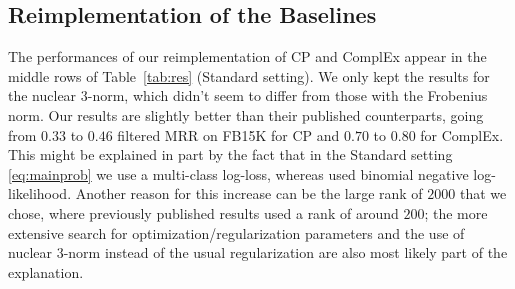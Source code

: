 \documentclass{article}
\newcommand{\CP}{{CP}\xspace}
\newcommand{\complex}{{ComplEx}\xspace}
\newcommand{\fb}{{FB15K}\xspace}
\begin{document}
\subsection{Reimplementation of the Baselines}
The performances of our reimplementation of \CP and \complex appear in the middle rows of Table~\ref{tab:res} (Standard setting). We only kept the results for the nuclear $3$-norm, which didn't seem to differ from those with the Frobenius norm. Our results are slightly better than their published counterparts, going from $0.33$ to $0.46$ filtered MRR on \fb for \CP and $0.70$ to $0.80$ for \complex.  This might be explained in part by the fact that in the Standard setting \eqref{eq:mainprob} we use a multi-class log-loss, whereas \citet{trouillon_complex_2016} used binomial negative log-likelihood. Another reason for this increase can be the large rank of $2000$ that we chose, where previously published results used a rank of around $200$; the more extensive search for optimization/regularization parameters and the use of nuclear $3$-norm instead of the usual regularization are also most likely part of the explanation.
\end{document}
